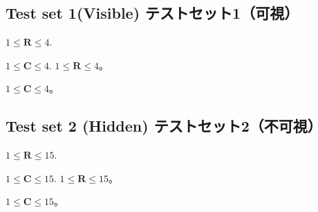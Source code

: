 \documentclass[uplatex,dvipdfmx]{jsarticle} \usepackage{amsmath,amssymb,bm}
\begin{document}
\subsection*{Test set 1(Visible) テストセット1（可視）}
\begin{paracol}{2}
$1 \leq \mathbf{R} \leq 4$.

$1 \leq \mathbf{C} \leq 4$.
\switchcolumn
$1 \leq \mathbf{R} \leq 4$。

$1 \leq \mathbf{C} \leq 4$。
\end{paracol}
\subsection*{Test set 2 (Hidden) テストセット2（不可視）}
\begin{paracol}{2}
$1 \leq \mathbf{R} \leq 15$.

$1 \leq \mathbf{C} \leq 15$.
\switchcolumn
$1 \leq \mathbf{R} \leq 15$。

$1 \leq \mathbf{C} \leq 15$。
\end{paracol}
\end{document}
